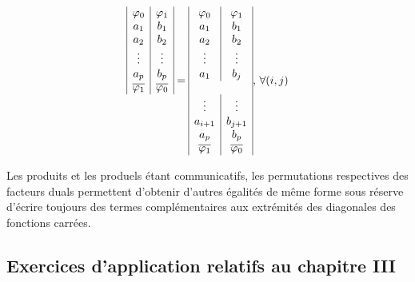 \medskip

\[
\begin{array}{|c|c|}  
		\varphi_0  &   \varphi_1  \\
		a_1        &     b_1      \\
		a_2        &     b_2      \\
		\vdots     &    \vdots    \\
		a_p        &    b_p       \\
  \overline{\varphi_1} & \overline{\varphi_0} \\	
  \multicolumn{2}{c}{\vspace*{1.5cm}}  \\	
  \end{array}  =  \begin{array}{|c|c|}  
		\varphi_0  &   \varphi_1  \\
		a_1        &     b_1      \\
		a_2        &     b_2      \\
		\vdots     &    \vdots    \\
		a_1        &    b_j       \\
		\multicolumn{2}{|c|}{}    \\
		\vdots     &    \vdots    \\
		a_{i+1}    &    b_{j +1}  \\
		a_p        &    b_p       \\
  \overline{\varphi_1} & \overline{\varphi_0} \\		
  \end{array} \text{, } \forall (i, j)  
\]

\medskip 



Les produits et les produels étant communicatifs, les permutations respectives des facteurs duals permettent d'obtenir d'autres égalités de même forme sous réserve d'écrire toujours des termes complémentaires aux extrémités des diagonales des fonctions carrées.

\subsection{Exercices d'application relatifs au chapitre III}


